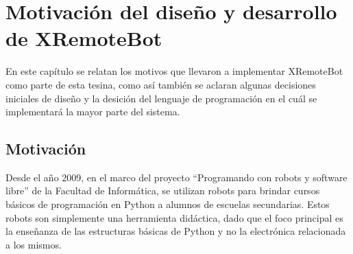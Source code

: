 \chapter{Motivación del diseño y desarrollo de XRemoteBot}\label{cha:motivacion}

En este capítulo se relatan los motivos que llevaron a implementar XRemoteBot como
parte de esta tesina, como así también se aclaran algunas decisiones iniciales de
diseño y la desición del lenguaje de programación en el cuál se implementará la mayor
parte del sistema.


\section{Motivación}\label{sec:motivacion}
Desde el año 2009, en el marco del proyecto ``Programando con robots y
software libre'' de la Facultad de Informática,
se utilizan robots para brindar cursos básicos de programación en Python a alumnos de escuelas
secundarias. Estos robots son simplemente una herramienta didáctica, dado que el foco principal es la enseñanza de las estructuras básicas de Python y no la electrónica relacionada a los mismos.



